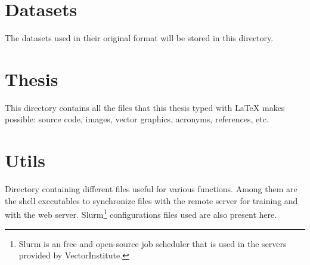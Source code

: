 \section{Datasets}\label{sec:datasets-dir}

The datasets used in their original format will be stored in this
directory.\medskip




\section{Thesis}\label{sec:thesis}

This directory contains all the files that this thesis typed with \LaTeX{}
makes possible: source code, images, vector graphics, acronyms, references,
etc.\medskip




\section{Utils}\label{sec:utils}

Directory containing different files useful for various functions. Among them
are the shell executables to synchronize files with the remote server for
training and with the web server. Slurm\footnote{Slurm is an free and
  open-source job scheduler that is used in the servers provided by
  VectorInstitute.} configurations files used are also present here.\medskip

